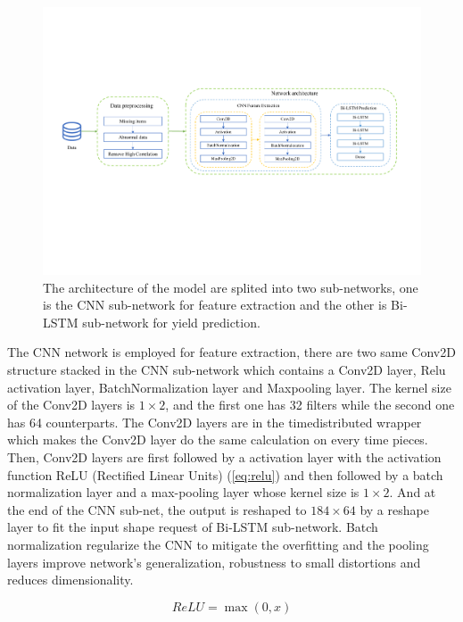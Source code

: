 \documentclass[conference, a4paper]{IEEEtran}
\begin{document}
      \begin{figure}[tb]
        \centering
        \includegraphics[width=\linewidth]{figures/new_arch.pdf}
        \caption{The architecture of the model are splited into two sub-networks, one is the CNN sub-network for feature extraction and the other is Bi-LSTM sub-network for yield prediction.}
        \label{fig:arch}
      \end{figure}

      The CNN network is employed for feature extraction, there are two same Conv2D structure stacked in the CNN sub-network which contains a Conv2D layer, Relu activation layer, BatchNormalization layer and Maxpooling layer. The kernel size of the Conv2D layers is $1\times2$, and the first one has 32 filters while the second one has 64 counterparts. The Conv2D layers are in the timedistributed wrapper which makes the Conv2D layer do the same calculation on every time pieces. Then, Conv2D layers are first followed by a activation layer with the activation function ReLU (Rectified Linear Units) (\ref{eq:relu}) and then followed by a batch normalization layer and a max-pooling layer whose kernel size is $1\times2$. And at the end of the CNN sub-net, the output is reshaped to $184\times64$ by a reshape layer to fit the input shape request of Bi-LSTM sub-network. Batch normalization regularize the CNN to mitigate the overfitting and the pooling layers improve network's generalization, robustness to small distortions and reduces dimensionality.

      \begin{equation}
        ReLU=\max(0, x)
        \label{eq:relu}
      \end{equation}
      
\end{document}
